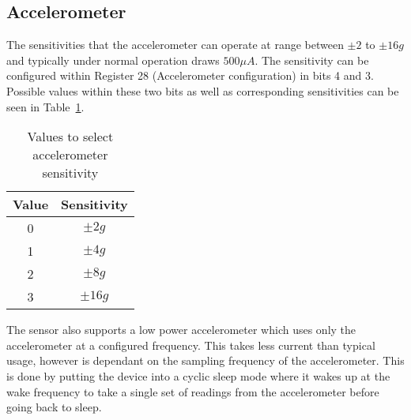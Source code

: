 \subsection{Accelerometer}

The sensitivities that the accelerometer can operate at range between $\pm 2$ to $\pm 16g$ and typically under normal operation draws $500\mu A$. The sensitivity can be configured within Register 28 (Accelerometer configuration) in bits 4 and 3. Possible values within these two bits as well as corresponding sensitivities can be seen in Table~\ref{tab:accel:range}. \cite{sensor_registers}

\begin{table}
	\centering
	\begin{tabular}{|c|c|}
		\hline
		Value & Sensitivity \\
		\hline
		0 & $\pm 2g$ \\
		1 & $\pm 4g$ \\
		2 & $\pm 8g$ \\
		3 & $\pm 16g$ \\
		\hline
	\end{tabular}
	\caption{Values to select accelerometer sensitivity}
	\label{tab:accel:range}
\end{table}

The sensor also supports a low power accelerometer which uses only the accelerometer at a configured frequency. This takes less current than typical usage, however is dependant on the sampling frequency of the accelerometer. This is done by putting the device into a cyclic sleep mode where it wakes up at the wake frequency to take a single set of readings from the accelerometer before going back to sleep.

